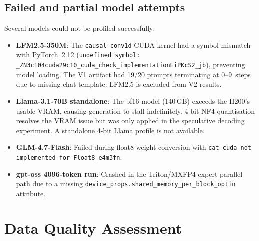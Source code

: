 \documentclass[11pt,a4paper]{article}
\newcommand{\code}[1]{\texttt{#1}}
\begin{document}
\subsection{Failed and partial model attempts}
\label{sec:results:failures}

Several models could not be profiled successfully:
\begin{itemize}\setlength\itemsep{1pt}
  \item \textbf{LFM2.5-350M}: The \code{causal-conv1d} CUDA
    kernel had a symbol mismatch with PyTorch~2.12
    (\code{undefined symbol:
    \_ZN3c104cuda29c10\_cuda\_check\_implementationEiPKcS2\_jb}),
    preventing model loading.
    The V1 artifact had 19/20 prompts terminating at 0--9~steps
    due to missing chat template.
    LFM2.5 is excluded from V2 results.
  \item \textbf{Llama-3.1-70B standalone}: The bf16 model
    (140\,GB) exceeds the H200's usable VRAM, causing
    generation to stall indefinitely.
    4-bit NF4 quantisation resolves the VRAM issue but was only
    applied in the speculative decoding experiment.
    A standalone 4-bit Llama profile is not available.
  \item \textbf{GLM-4.7-Flash}: Failed during float8 weight
    conversion with
    \code{cat\_cuda not implemented for Float8\_e4m3fn}.
  \item \textbf{gpt-oss 4096-token run}: Crashed in the
    Triton/MXFP4 expert-parallel path due to a missing
    \code{device\_props.shared\_memory\_per\_block\_optin}
    attribute.
\end{itemize}

\section{Data Quality Assessment}
\label{sec:quality}
\end{document}
